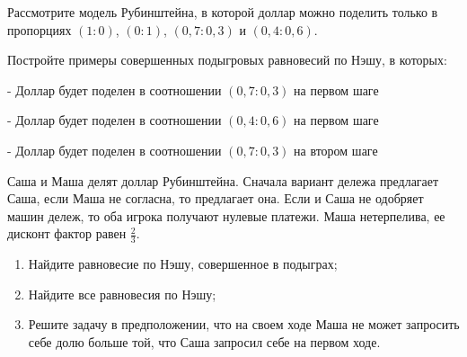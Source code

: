 \begin{problem}
Рассмотрите модель Рубинштейна, в которой доллар можно поделить только в пропорциях  $\left(1:0\right)$,  $\left(0:1\right)$,  $\left(0,7:0,3\right)$  и  $\left(0,4:0,6\right)$.\par
Постройте примеры совершенных подыгровых равновесий по Нэшу, в которых:\par
- Доллар будет поделен в соотношении  $\left(0,7:0,3\right)$  на первом шаге\par
- Доллар будет поделен в соотношении  $\left(0,4:0,6\right)$  на первом шаге\par
- Доллар будет поделен в соотношении  $\left(0,7:0,3\right)$  на втором шаге\par



\begin{sol}

\end{sol}
\end{problem}



\begin{problem}
\begin{source}
 [LSE, 1998]\end{source}
Саша и Маша делят доллар Рубинштейна. Сначала вариант дележа предлагает Саша, если Маша не согласна, то предлагает она. Если и Саша не одобряет машин дележ, то оба игрока получают нулевые платежи. Маша нетерпелива, ее дисконт фактор равен  $\frac{2}{3} $.\par
\begin{enumerate}
\item  Найдите равновесие по Нэшу, совершенное в подыграх;\par
\item Найдите все равновесия по Нэшу;\par
\item  Решите задачу в предположении, что на своем ходе Маша не может запросить себе долю больше той, что Саша запросил себе на первом ходе.
\end{enumerate}


\begin{sol}

\end{sol}
\end{problem}



